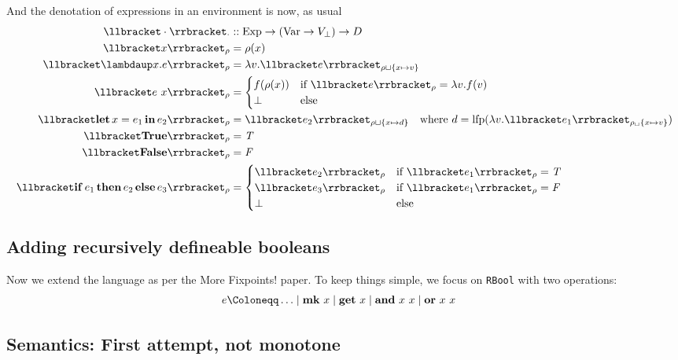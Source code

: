 \documentclass[manuscript,screen,acmsmall,nonacm]{acmart}
\begin{document}
And the denotation of expressions in an environment is now, as usual
\begin{align*}
\D{\cdot}_\cdot &:: \Exp \to (\Var \to V_\bot) \to D \\
\D{x}_\rho &= \rho(x) \\
\D{\slambda x. e}_\rho &= \dlambda v. \D{e}_{\rho \sqcup \{x \mapsto v\}} \\
\D{e~x}_\rho &=
\begin{cases}
f(\rho(x)) &\text{if } \D{e}_\rho = \dlambda v. f(v) \\
\bot &\text{else}
\end{cases}\\
\D{\sLet{x}{e_1}{e_2}}_\rho &=
\D{e_2}_{\rho \sqcup \{x \mapsto d \}}
\quad \text{where } d = \lfp(\dlambda v. \D{e_1}_{\rho_\sqcup\{x \mapsto v\}}) \\
\D{\sTrue}_\rho &= \dTrue\\
\D{\sFalse}_\rho &= \dFalse\\
\D{\sIf{e_1}{e_2}{e_3}}_\rho &=
\begin{cases}
\D{e_2}_\rho &\text{if } \D{e_1}_\rho = \dTrue \\
\D{e_3}_\rho &\text{if } \D{e_1}_\rho = \dFalse \\
\bot &\text{else}
\end{cases}
\end{align*}

\subsection{Adding recursively defineable booleans}

Now we extend the language as per the More Fixpoints! paper. To keep things simple, we focus on \texttt{RBool} with two operations:
\begin{align*}
e &\Coloneqq \ldots \mid \sMk~x \mid \sGet~x \mid \sAnd~x~x \mid \sOr~x~x
\end{align*}

\subsection{Semantics: First attempt, not monotone}

\newcommand{\rBool}{\mathcal B}
\newcommand{\rTrue}{\mathcal T}
\newcommand{\rFalse}{\mathcal F}
\end{document}
